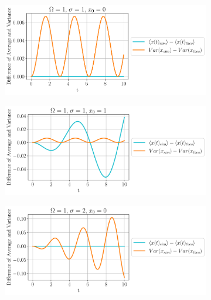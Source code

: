 \begin{figure}[h!]
     \begin{subfigure}[h]{0.65\textwidth}
         \centering
         \includegraphics[width=\textwidth]{plot/Omega1_sigma1_x00_Averages_expect.pdf}
         \caption{}
         
     \end{subfigure}
     \begin{subfigure}[h]{0.4\textwidth}
         \centering
         \includegraphics[width=\textwidth]{plot/Omega1_sigma1_x01_Averages_expect.pdf}
         \caption{}
         
     \end{subfigure}
     \begin{subfigure}[h]{0.65\textwidth}
         \centering
         \includegraphics[width=\textwidth]{plot/Omega1_sigma2_x00_Averages_expect.pdf}
         \caption{}
         

\end{subfigure}
\end{figure}

